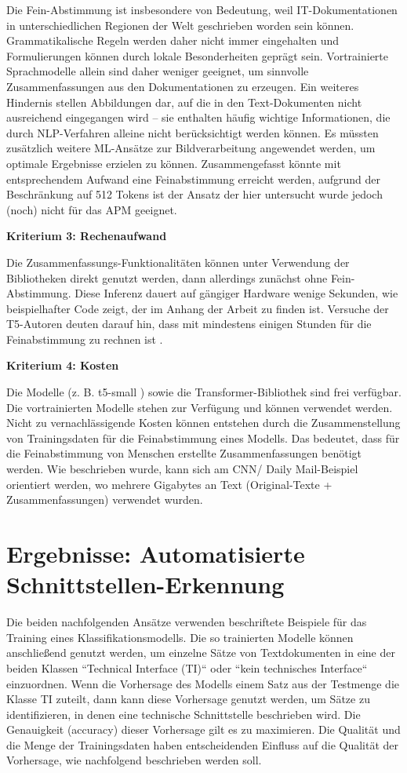 Die Fein-Abstimmung ist insbesondere von Bedeutung, weil IT-Dokumentationen in unterschiedlichen Regionen der Welt geschrieben worden sein können. Grammatikalische Regeln werden daher nicht immer eingehalten und Formulierungen können durch lokale Besonderheiten geprägt sein. Vortrainierte Sprachmodelle allein sind daher weniger geeignet, um sinnvolle Zusammenfassungen aus den Dokumentationen zu erzeugen. Ein weiteres Hindernis stellen Abbildungen dar, auf die in den Text-Dokumenten nicht ausreichend eingegangen wird – sie enthalten häufig wichtige Informationen, die durch NLP-Verfahren alleine nicht berücksichtigt werden können. Es müssten zusätzlich weitere ML-Ansätze zur Bildverarbeitung angewendet werden, um optimale Ergebnisse erzielen zu können. Zusammengefasst könnte mit entsprechendem Aufwand eine Feinabstimmung erreicht werden, aufgrund der Beschränkung auf 512 Tokens ist der Ansatz der hier untersucht wurde jedoch (noch) nicht für das APM geeignet.

{\bf Kriterium 3: Rechenaufwand}

Die Zusammenfassungs-Funktionalitäten können unter Verwendung der Bibliotheken direkt genutzt werden, dann allerdings zunächst ohne Fein-Abstimmung. Diese Inferenz dauert auf gängiger Hardware wenige Sekunden, wie beispielhafter Code zeigt, der im Anhang der Arbeit zu finden ist. Versuche der T5-Autoren deuten darauf hin, dass mit mindestens einigen Stunden für die Feinabstimmung zu rechnen ist \cite{Raffel}.

{\bf Kriterium 4: Kosten}

Die Modelle (z. B. t5-small \cite{t5}) sowie die Transformer-Bibliothek \cite{Transformers} sind frei verfügbar. Die vortrainierten Modelle stehen zur Verfügung und können verwendet werden. Nicht zu vernachlässigende Kosten können entstehen durch die Zusammenstellung von Trainingsdaten für die Feinabstimmung eines Modells. Das bedeutet, dass für die Feinabstimmung von Menschen erstellte Zusammenfassungen benötigt werden. Wie beschrieben wurde, kann sich am CNN/ Daily Mail-Beispiel orientiert werden, wo mehrere Gigabytes an Text (Original-Texte + Zusammenfassungen) verwendet wurden. 

\section{Ergebnisse: Automatisierte Schnittstellen-Erkennung}

Die beiden nachfolgenden Ansätze verwenden beschriftete Beispiele für das Training eines Klassifikationsmodells. Die so trainierten Modelle können anschließend genutzt werden, um einzelne Sätze von Textdokumenten in eine der beiden Klassen ``Technical Interface (TI)`` oder ``kein technisches Interface`` einzuordnen. Wenn die Vorhersage des Modells einem Satz aus der Testmenge die Klasse TI zuteilt, dann kann diese Vorhersage genutzt werden, um Sätze zu identifizieren, in denen eine technische Schnittstelle beschrieben wird. Die Genauigkeit (accuracy) dieser Vorhersage gilt es zu maximieren. Die Qualität und die Menge der Trainingsdaten haben entscheidenden Einfluss auf die Qualität der Vorhersage, wie nachfolgend beschrieben werden soll.

